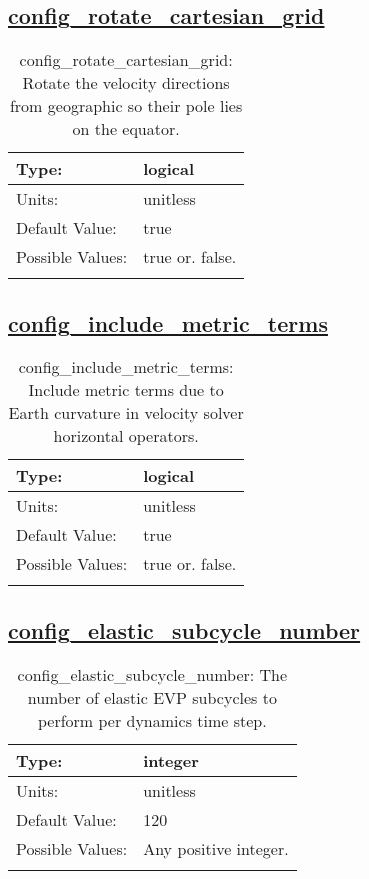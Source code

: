 \subsection[config\_rotate\_cartesian\_grid]{\hyperref[sec:nm_tab_velocity_solver]{config\_rotate\_cartesian\_grid}}
\label{subsec:nm_sec_config_rotate_cartesian_grid}
\begin{center}
\begin{longtable}{| p{2.0in} || p{4.0in} |}
    \hline
    Type: & logical \\
    \hline
    Units: & \si{unitless} \\
    \hline
    Default Value: & true \\
    \hline
    Possible Values: & true or. false. \\
    \hline
    \caption{config\_rotate\_cartesian\_grid: Rotate the velocity directions from geographic so their pole lies on the equator.}
\end{longtable}
\end{center}
\subsection[config\_include\_metric\_terms]{\hyperref[sec:nm_tab_velocity_solver]{config\_include\_metric\_terms}}
\label{subsec:nm_sec_config_include_metric_terms}
\begin{center}
\begin{longtable}{| p{2.0in} || p{4.0in} |}
    \hline
    Type: & logical \\
    \hline
    Units: & \si{unitless} \\
    \hline
    Default Value: & true \\
    \hline
    Possible Values: & true or. false. \\
    \hline
    \caption{config\_include\_metric\_terms: Include metric terms due to Earth curvature in velocity solver horizontal operators.}
\end{longtable}
\end{center}
\subsection[config\_elastic\_subcycle\_number]{\hyperref[sec:nm_tab_velocity_solver]{config\_elastic\_subcycle\_number}}
\label{subsec:nm_sec_config_elastic_subcycle_number}
\begin{center}
\begin{longtable}{| p{2.0in} || p{4.0in} |}
    \hline
    Type: & integer \\
    \hline
    Units: & \si{unitless} \\
    \hline
    Default Value: & 120 \\
    \hline
    Possible Values: & Any positive integer. \\
    \hline
    \caption{config\_elastic\_subcycle\_number: The number of elastic EVP subcycles to perform per dynamics time step.}
\end{longtable}
\end{center}

